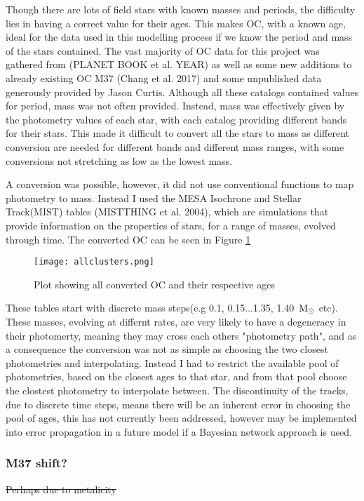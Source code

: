 \documentclass[fleqn,usenatbib]{mnras}
\begin{document}
Though there are lots of field stars with known masses and periods, the difficulty lies in having a correct value for their ages.
This makes OC, with a known age, ideal for the data used in this modelling process if we know the period and mass of the stars contained.
The vast majority of OC data for this project was gathered from \cite{bookthingy}(PLANET BOOK et al. YEAR) as well as some new additions to already existing OC M37 \cite{chang}(Chang et al. 2017) and some unpublished data generously provided by Jason Curtis.
Although all these catalogs contained values for period, mass was not often provided.
Instead, mass was effectively given by the photometry values of each star, with each catalog providing different bands for their stars.
This made it difficult to convert all the stars to mass as different conversion are needed for different bands and different mass ranges, with some conversions not stretching as low as the lowest mass.

A conversion was possible, however, it did not use conventional functions to map photometry to mass. 
Instead I used the MESA Isochrone and Stellar Track(MIST) tables \cite{MIST}(MISTTHING et al. 2004), which are simulations that provide information on the properties of stars, for a range of masses, evolved through time.
The converted OC can be seen in Figure \ref{fig:allclusters}
\begin{figure}
	\centering
	\texttt{[image: allclusters.png]}
	\caption[]{Plot showing all converted OC and their respective ages}
	\label{fig:allclusters}
	
\end{figure}


These tables start with discrete mass steps(e.g 0.1, 0.15...1.35, 1.40~$\textup{M}_\odot$ etc).
These masses, evolving at differnt rates, are very likely to have a degeneracy in their photomerty, meaning they may cross each others "photometry path", and as a consequence the conversion was not as simple as choosing the two closest photometries and interpolating.
Instead I had to restrict the available pool of photometries, based on the closest ages to that star, and from that pool choose the clostest photometry to interpolate between.
The discontinuity of the tracks, due to discrete time steps, means there will be an inherent error in choosing the pool of ages, this has not currently been addressed, however may be implemented into error propagation in a future model if a Bayesian network approach is used. 

\subsubsection{M37 shift?}
\sout{Perhaps due to metalicity}
\end{document}
